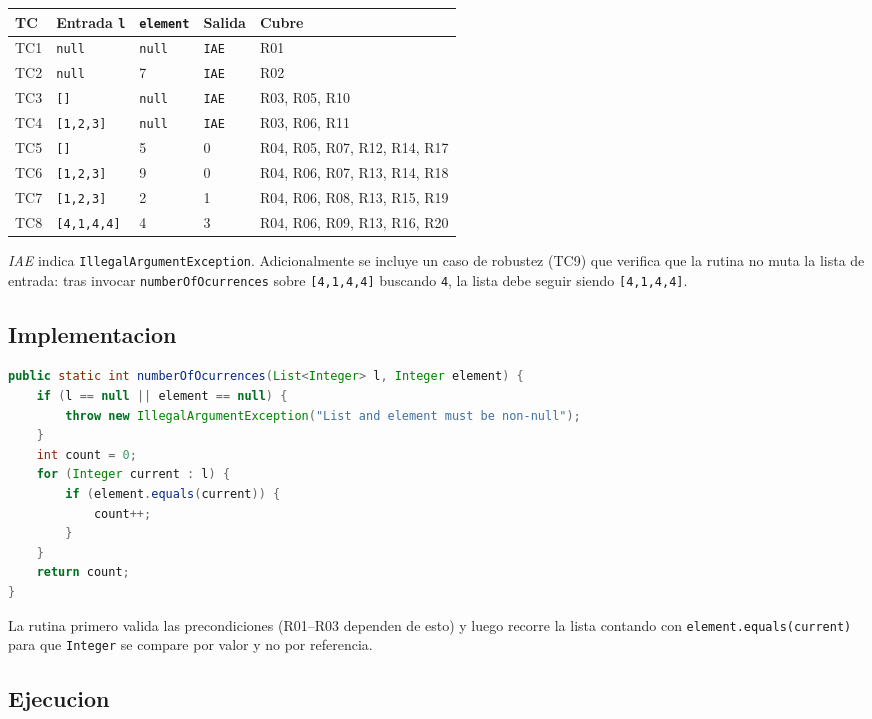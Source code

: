 \documentclass[12pt,a4paper]{article}
\begin{document}
\begin{longtable}{@{}p{1cm}p{4.5cm}p{2.5cm}p{2.2cm}p{3cm}@{}}
\toprule
\textbf{TC} & \textbf{Entrada \texttt{l}} & \textbf{\texttt{element}} & \textbf{Salida} & \textbf{Cubre} \\
\midrule
\endhead
TC1 & \texttt{null} & \texttt{null} & \texttt{IAE} & R01 \\
TC2 & \texttt{null} & 7 & \texttt{IAE} & R02 \\
TC3 & \texttt{[]} & \texttt{null} & \texttt{IAE} & R03, R05, R10 \\
TC4 & \texttt{[1,2,3]} & \texttt{null} & \texttt{IAE} & R03, R06, R11 \\
TC5 & \texttt{[]} & 5 & 0 & R04, R05, R07, R12, R14, R17 \\
TC6 & \texttt{[1,2,3]} & 9 & 0 & R04, R06, R07, R13, R14, R18 \\
TC7 & \texttt{[1,2,3]} & 2 & 1 & R04, R06, R08, R13, R15, R19 \\
TC8 & \texttt{[4,1,4,4]} & 4 & 3 & R04, R06, R09, R13, R16, R20 \\
\bottomrule
\end{longtable}

\noindent \textit{IAE} indica \texttt{IllegalArgumentException}. Adicionalmente se incluye un caso
de robustez (TC9) que verifica que la rutina no muta la lista de entrada: tras invocar
\texttt{numberOfOcurrences} sobre \texttt{[4,1,4,4]} buscando \texttt{4}, la lista debe seguir
siendo \texttt{[4,1,4,4]}.

\subsection{Implementacion}

\begin{lstlisting}[style=codestyle,language=Java]
public static int numberOfOcurrences(List<Integer> l, Integer element) {
    if (l == null || element == null) {
        throw new IllegalArgumentException("List and element must be non-null");
    }
    int count = 0;
    for (Integer current : l) {
        if (element.equals(current)) {
            count++;
        }
    }
    return count;
}
\end{lstlisting}

La rutina primero valida las precondiciones (R01--R03 dependen de esto) y luego recorre la lista
contando con \texttt{element.equals(current)} para que \texttt{Integer} se compare por valor y no
por referencia.

\subsection{Ejecucion}
\end{document}

